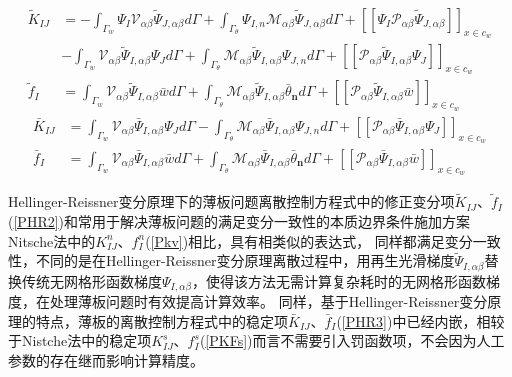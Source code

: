 \begin{subequations}\label{PHR2}
\begin{align}
  \tilde{K}_{IJ}&=-\int_{\Gamma_w}\Psi_I\mathcal{V}_{\alpha\beta}\tilde{\Psi}_{J,\alpha\beta}d\Gamma+\int_{\Gamma_{\theta}}\Psi_{I,n}\mathcal{M}_{\alpha\beta}\tilde{\Psi}_{J,\alpha\beta}d\Gamma+[[\Psi_I\mathcal{P}_{\alpha\beta}\tilde{\Psi}_{J,\alpha\beta}]]_{x\in{c_w}}\nonumber\\
    &-\int_{\Gamma_w}\mathcal{V}_{\alpha\beta}\tilde{\Psi}_{I,\alpha\beta}\Psi_Jd\Gamma+\int_{\Gamma_{\theta}}\mathcal{M}_{\alpha\beta}\tilde{\Psi}_{I,\alpha\beta}\Psi_{J,n}d\Gamma+[[\mathcal{P}_{\alpha\beta}\tilde{\Psi}_{I,\alpha\beta}\Psi_J]]_{x\in{c_w}} \\
    \tilde{f}_I&=\int_{\Gamma_w}\mathcal{V}_{\alpha\beta}\tilde{\Psi}_{I,\alpha\beta}\bar{w}d\Gamma+\int_{\Gamma_{\theta}}\mathcal{M}_{\alpha\beta}\tilde{\Psi}_{I,\alpha\beta}\bar{\theta}_{\pmb n}d\Gamma+[[\mathcal{P}_{\alpha\beta}\tilde{\Psi}_{I,\alpha\beta}\bar{w}]]_{x\in{c_w}}
\end{align}
\end{subequations}
\begin{subequations}\label{PHR3}
\begin{align}
    \bar{K}_{IJ}&=\int_{\Gamma_w}\mathcal{V}_{\alpha\beta}\bar{\Psi}_{I,\alpha\beta}\Psi_Jd\Gamma-\int_{\Gamma_{\theta}}\mathcal{M}_{\alpha\beta}\bar{\Psi}_{I,\alpha\beta}\Psi_{J,n}d\Gamma+[[\mathcal{P}_{\alpha\beta}\bar{\Psi}_{I,\alpha\beta}\Psi_J]]_{x\in{c_w}}\\
    \bar{f}_I&=\int_{\Gamma_w}\mathcal{V}_{\alpha\beta}\bar{\Psi}_{I,\alpha\beta}\bar{w}d\Gamma+\int_{\Gamma_{\theta}}\mathcal{M}_{\alpha\beta}\bar{\Psi}_{I,\alpha\beta}\bar{\theta}_{\pmb n}d\Gamma+[[\mathcal{P}_{\alpha\beta}\bar{\Psi}_{I,\alpha\beta}\bar{w}]]_{x\in{c_w}}
\end{align}
\end{subequations}
\par
Hellinger-Reissner变分原理下的薄板问题离散控制方程式中的修正变分项$\tilde{K}_{IJ}$、$\tilde{f}_I$(\ref{PHR2})和常用于解决薄板问题的满足变分一致性的本质边界条件施加方案Nitsche法中的$K_{IJ}^n$、$f_I^n$(\ref{Pkv})相比，具有相类似的表达式，
同样都满足变分一致性，不同的是在Hellinger-Reissner变分原理离散过程中，用再生光滑梯度$\tilde{\Psi}_{I,\alpha\beta}$替换传统无网格形函数梯度$\Psi_{I,\alpha\beta}$，使得该方法无需计算复杂耗时的无网格形函数梯度，在处理薄板问题时有效提高计算效率。
同样，基于Hellinger-Reissner变分原理的特点，薄板的离散控制方程式中的稳定项$\bar{K}_{IJ}$、$\bar{f}_I$(\ref{PHR3})中已经内嵌，相较于Nistche法中的稳定项$K^s_{IJ}$、$f^s_I$(\ref{PKFs})而言不需要引入罚函数项，不会因为人工参数的存在继而影响计算精度。
